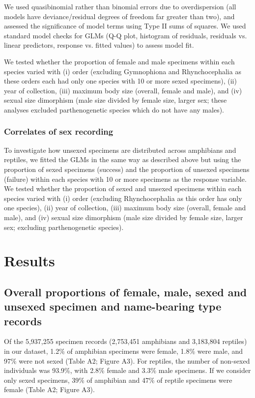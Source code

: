 \documentclass[a4paper, 12pt]{article}
\begin{document}
We used quasibinomial rather than binomial errors due to overdispersion (all models have deviance/residual degrees of freedom far greater than two), and assessed the significance of model terms using Type II sums of squares. 
We used standard model checks for GLMs (Q-Q plot, histogram of residuals, residuals vs. linear predictors, response vs. fitted values) to assess model fit. 

We tested whether the proportion of female and male specimens within each species varied with (i) order (excluding Gymnophiona and Rhynchocephalia as these orders each had only one species with 10 or more sexed specimens), (ii) year of collection, (iii) maximum body size (overall, female and male), and (iv) sexual size dimorphism (male size divided by female size, larger sex; these analyses excluded parthenogenetic species which do not have any males). 

\subsubsection{Correlates of sex recording}
To investigate how unsexed specimens are distributed across amphibians and reptiles, we fitted the GLMs in the same way as described above but using the proportion of sexed specimens (success) and the proportion of unsexed specimens (failure) within each species with 10 or more specimens as the response variable. 
We tested whether the proportion of sexed and unsexed specimens within each species varied with (i) order (excluding Rhynchocephalia as this order has only one species), (ii) year of collection, (iii) maximum body size (overall, female and male), and (iv) sexual size dimorphism (male size divided by female size, larger sex; excluding parthenogenetic species).

\section{Results}

\subsection{Overall proportions of female, male, sexed and unsexed specimen and name-bearing type records}
Of the 5,937,255 specimen records (2,753,451 amphibians and 3,183,804 reptiles) in our dataset, 1.2\% of amphibian specimens were female, 1.8\% were male, and 97\% were not sexed (Table A2; Figure A3). 
For reptiles, the number of non-sexed individuals was 93.9\%, with 2.8\% female and 3.3\% male specimens. 
If we consider only sexed specimens, 39\% of amphibian and 47\% of reptile specimens were female (Table A2; Figure A3). 
\end{document}
